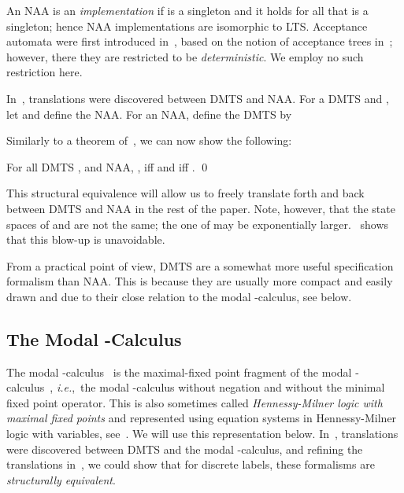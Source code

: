 \documentclass[twocolumn]{svjour3-dummy}
\newcommand*\ie{\textit{i.e.},}
\newcommand*\NAA{NAA\xspace}
\newcommand*\noproof{\qed}
\begin{document}
An \NAA is an \emph{implementation} if  is a singleton and
it holds for all  that  is a singleton; hence \NAA implementations are
isomorphic to LTS.
Acceptance automata were first introduced
in~\cite{report/irisa/Raclet07}, based on the notion of acceptance trees
in~\cite{DBLP:journals/jacm/Hennessy85}; however, there they are
restricted to be \emph{deterministic}.  We employ no such restriction
here.

In~\cite{DBLP:conf/concur/BenesDFKL13}, translations were discovered
between DMTS and \NAA.  For a DMTS  and
, let  and
define the \NAA .
For an \NAA , define the DMTS  by


Similarly to a theorem of~\cite{DBLP:conf/concur/BenesDFKL13,
  DBLP:conf/ictac/FahrenbergLT14}, we can now show the following:

\begin{theorem}
  \label{th:dmtsvsaa-bool}
  For all DMTS ,  and \NAA , ,  iff  and  iff .  \noproof
\end{theorem}

This structural equivalence will allow us to freely translate forth and
back between DMTS and \NAA in the rest of the paper.  Note, however, that
the state spaces of  and  are not the same; the one of
 may be exponentially larger.
\cite{DBLP:conf/ictac/FahrenbergLT14}~shows that this blow-up is
unavoidable.

From a practical point of view, DMTS are a somewhat more useful
specification formalism than \NAA.  This is because they are usually more
compact and easily drawn and due to their close relation to the modal
-calculus, see below.

\subsection{The Modal -Calculus}

The modal -calculus~\cite{DBLP:journals/deds/FeuilladeP07} is the
maximal-fixed point fragment of the modal
-calculus~\cite{DBLP:journals/tcs/Kozen83}, \ie~the modal
-calculus without negation and without the minimal fixed point
operator.  This is also sometimes called \emph{Henn\-essy-Milner logic
  with maximal fixed points} and represented using equation systems in
Hennessy-Milner logic with variables,
see~\cite{DBLP:journals/tcs/Larsen90, books/AcetoILS07}.  We will use
this representation below.  In~\cite{DBLP:conf/concur/BenesDFKL13},
translations were discovered between DMTS and the modal
-calculus, and refining the translations
in~\cite{DBLP:conf/ictac/FahrenbergLT14}, we could show that for
discrete labels, these formalisms are \emph{structurally equivalent}.
\end{document}
